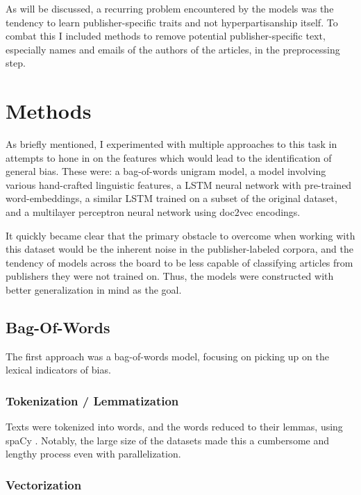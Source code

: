 \documentclass[11pt, a4paper]{article}
\begin{document}
As will be discussed, a recurring problem encountered by the models was the tendency to learn publisher-specific traits and not hyperpartisanship itself. To combat this I included methods to remove potential publisher-specific text, especially names and emails of the authors of the articles, in the preprocessing step. 

\section{Methods}

As briefly mentioned, I experimented with multiple approaches to this task in attempts to hone in on the features which would lead to the identification of general bias. These were: a bag-of-words unigram model, a model involving various hand-crafted linguistic features, a LSTM neural network with pre-trained word-embeddings, a similar LSTM trained on a subset of the original dataset, and a multilayer perceptron neural network using doc2vec encodings.

It quickly became clear that the primary obstacle to overcome when working with this dataset would be the inherent noise in the publisher-labeled corpora, and the tendency of models across the board to be less capable of classifying articles from publishers they were not trained on. Thus, the models were constructed with better generalization in mind as the goal.

\subsection{Bag-Of-Words}

The first approach was a bag-of-words model, focusing on picking up on the lexical indicators of bias.

\subsubsection{Tokenization / Lemmatization}

Texts were tokenized into words, and the words reduced to their lemmas, using spaCy \cite{honnibal-johnson:2015:EMNLP}. Notably, the large size of the datasets made this a cumbersome and lengthy process even with parallelization.

\subsubsection{Vectorization}
\end{document}
